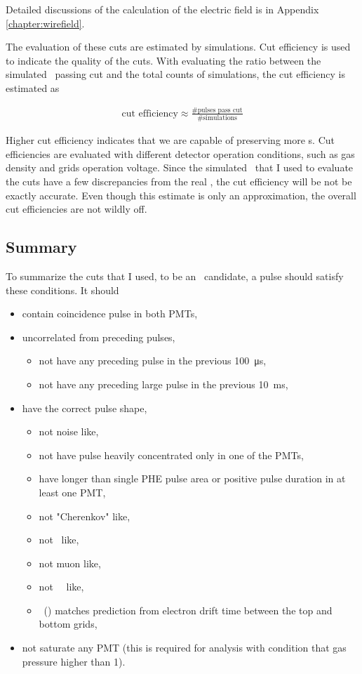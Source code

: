 Detailed discussions of the calculation of the electric field is in Appendix \ref{chapter:wirefield}.


The evaluation of these cuts are estimated by simulations. Cut efficiency is used to indicate the quality of the cuts. With evaluating the ratio between the simulated \eep\ passing cut and the total counts of simulations, the cut efficiency is estimated as 

\begin{align}
 \text{cut efficiency} \approx \frac{\text{\# pulses pass cut}}{\text{\# simulations}}
\end{align} 

Higher cut efficiency indicates that we are capable of preserving more \eep s. Cut efficiencies are evaluated with different detector operation conditions, such as gas density and grids operation voltage. Since the simulated \eep\ that I used to evaluate the cuts have a few discrepancies from the real \eep, the cut efficiency will be not be exactly accurate. Even though this estimate is only an approximation, the overall cut efficiencies are not wildly off.

\subsection{Summary}
To summarize the cuts that I used, to be an \eep\ candidate, a pulse should satisfy these conditions. It should
\begin{itemize}
\item contain coincidence pulse in both PMTs,
\item uncorrelated from preceding pulses,
 \begin{itemize}
 \item not have any preceding pulse in the previous \SI{100}{\us},
 \item not have any preceding large pulse in the previous \SI{10}{\ms},
 \end{itemize}
\item have the correct pulse shape, 
 \begin{itemize}
 	 \item not noise like,
 	 \item not have pulse heavily concentrated only in one of the PMTs,
 \item have longer than single PHE pulse area or positive pulse duration in at least one PMT,
 \item not "Cherenkov" like, 
 \item not \sone\ like,
 \item not muon like,
 \item not \sone\ \stwo\ like,

 \item \ttenninety\ (\rpd ) matches prediction from electron drift time between the top and bottom grids, 
 \end{itemize}
\item not saturate any PMT (this is required for analysis with condition that gas pressure higher than \SI{1}{\bara}).
\end{itemize}




